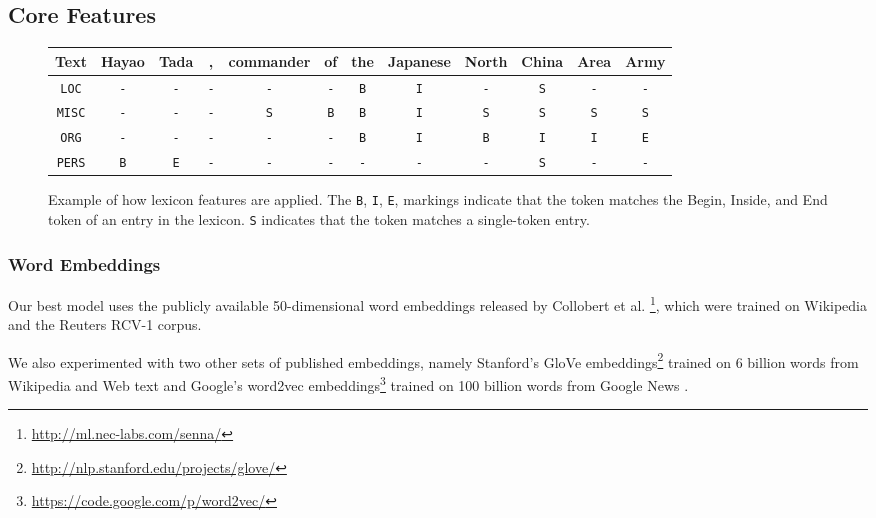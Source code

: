 \documentclass[11pt,letterpaper]{article}
\begin{document}
\subsection{Core Features}

\begin{figure}[ht!]
\begin{center}
\small
\begin{tabular}{c|ccccccccccc}
\small
Text & Hayao & Tada & , & commander & of & the & Japanese & North & China & Area & Army \\ \hline

{\tt LOC}  & {\tt -} & {\tt -} & {\tt -} & {\tt -} & {\tt -} & {\tt B} & {\tt I} & {\tt -} & {\tt S} & {\tt -} & {\tt -} \\
{\tt MISC} & {\tt -} & {\tt -} & {\tt -} & {\tt S} & {\tt B} & {\tt B} & {\tt I} & {\tt S} & {\tt S} & {\tt S} & {\tt S} \\
{\tt ORG}  & {\tt -} & {\tt -} & {\tt -} & {\tt -} & {\tt -} & {\tt B} & {\tt I} & {\tt B} & {\tt I} & {\tt I} & {\tt E} \\
{\tt PERS} & {\tt B} & {\tt E} & {\tt -} & {\tt -} & {\tt -} & {\tt -} & {\tt -} & {\tt -} & {\tt S} & {\tt -} & {\tt -}  
\end{tabular}
\end{center}
\caption{Example of how lexicon features are applied. The {\tt B}, {\tt I}, {\tt E}, markings indicate that the token matches the Begin, Inside, and End token of an entry in the lexicon. {\tt S} indicates that the token matches a single-token entry.}
\label{fig:lexicon-example}
\end{figure}

\subsubsection{Word Embeddings}
Our best model uses the publicly available 50-dimensional word embeddings released by Collobert et al. \footnote{\url{http://ml.nec-labs.com/senna/}}, which were trained on Wikipedia and the Reuters RCV-1 corpus. 

We also experimented with two other sets of published embeddings, namely Stanford's GloVe embeddings\footnote{\url{http://nlp.stanford.edu/projects/glove/}} trained on 6 billion words from Wikipedia and Web text \cite{pennington2014} and Google's word2vec embeddings\footnote{\url{https://code.google.com/p/word2vec/}} trained on 100 billion words from Google News \cite{mikolov2013}.
\end{document}
